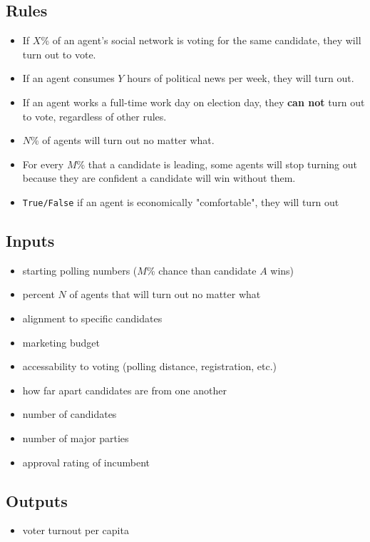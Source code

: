 \documentclass[titlepage, 12pt, leqno]{article}
\begin{document}
\subsection{Rules}
\begin{itemize}
    \item If $X$\% of an agent's social network is voting for the same candidate,
        they will turn out to vote.
    \item If an agent consumes $Y$ hours of political news per week, they will
        turn out.
    \item If an agent works a full-time work day on election day, they \textbf{can
        not} turn out to vote, regardless of other rules.
    \item $N$\% of agents will turn out no matter what.
    \item For every $M$\% that a candidate is leading, some agents will stop 
        turning out because they are confident a candidate will win without them.
    \item \texttt{True/False} if an agent is economically "comfortable", they
        will turn out
\end{itemize}

\subsection{Inputs}
\begin{itemize}
    \item starting polling numbers ($M$\% chance than candidate $A$ wins)
    \item percent $N$ of agents that will turn out no matter what
    \item alignment to specific candidates
    \item marketing budget
    \item accessability to voting (polling distance, registration, etc.)
    \item how far apart candidates are from one another
    \item number of candidates
    \item number of major parties
    \item approval rating of incumbent
\end{itemize}

\subsection{Outputs}
\begin{itemize}
    \item voter turnout per capita
\end{itemize}
\end{document}
